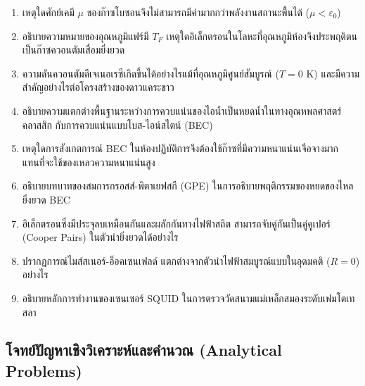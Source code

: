 \begin{enumerate}[label=\textbf{\arabic*.}]
    \item เหตุใดศักย์เคมี $\mu$ ของก๊าซโบซอนจึงไม่สามารถมีค่ามากกว่าพลังงานสถานะพื้นได้ ($\mu < \varepsilon_0$)
    \item อธิบายความหมายของอุณหภูมิแฟร์มี $T_F$ เหตุใดอิเล็กตรอนในโลหะที่อุณหภูมิห้องจึงประพฤติตนเป็นก๊าซควอนตัมเสื่อมยิ่งยวด
    \item ความดันควอนตัมดีเจเนอเรซีเกิดขึ้นได้อย่างไรแม้ที่อุณหภูมิศูนย์สัมบูรณ์ ($T = 0\text{ K}$) และมีความสำคัญอย่างไรต่อโครงสร้างของดาวแคระขาว
    \item อธิบายความแตกต่างพื้นฐานระหว่างการควบแน่นของไอน้ำเป็นหยดน้ำในทางอุณหพลศาสตร์คลาสสิก กับการควบแน่นแบบโบส-ไอน์สไตน์ (BEC)
    \item เหตุใดการสังเกตการณ์ BEC ในห้องปฏิบัติการจึงต้องใช้ก๊าซที่มีความหนาแน่นเจือจางมาก แทนที่จะใช้ของเหลวความหนาแน่นสูง
    \item อธิบายบทบาทของสมการกรอสส์-พิตาเยฟสกี (GPE) ในการอธิบายพฤติกรรมของหยดของไหลยิ่งยวด BEC
    \item อิเล็กตรอนซึ่งมีประจุลบเหมือนกันและผลักกันทางไฟฟ้าสถิต สามารถจับคู่กันเป็นคู่คูเปอร์ (Cooper Pairs) ในตัวนำยิ่งยวดได้อย่างไร
    \item ปรากฏการณ์ไมส์สเนอร์-อ็อคเซนเฟลด์ แตกต่างจากตัวนำไฟฟ้าสมบูรณ์แบบในอุดมคติ ($R = 0$) อย่างไร
    \item อธิบายหลักการทำงานของเซนเซอร์ SQUID ในการตรวจวัดสนามแม่เหล็กสมองระดับเฟมโตเทสลา
\end{enumerate}

\subsection*{โจทย์ปัญหาเชิงวิเคราะห์และคำนวณ (Analytical Problems)}

